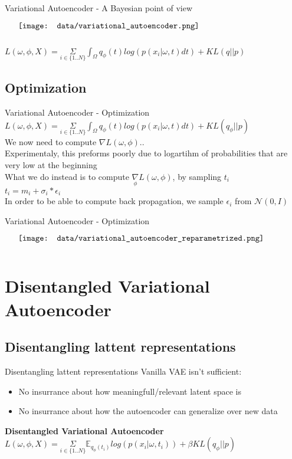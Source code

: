 \documentclass{beamer}
\begin{document}
\begin{frame}{Variational Autoencoder - A Bayesian point of view}
    \begin{minipage}{5in}
    \centering
    $\vcenter{
    \texttt{[image: data/variational\_autoencoder.png]} \\
    }$
    \end{minipage}
    $ L(\omega, \phi, X)= \underset{i \in \{1..N\}}{\Sigma} \int_\Omega q_\phi(t) log( p(x_i | \omega, t) dt) + KL( q || p ) $
\end{frame}


\subsection{Optimization}
\begin{frame}{Variational Autoencoder - Optimization}
        $ L(\omega, \phi, X)= \underset{i \in \{1..N\}}{\Sigma} \int_\Omega q_\phi(t) log( p(x_i | \omega, t) dt) + KL( q_\phi || p ) $\\
	We now need to compute $\nabla L(\omega, \phi).$.\\
	Experimentaly, this preforms poorly due to logartihm of probabilities that are very low at the beginning\\
	What we do instead is to compute $\underset{\phi}{\nabla} L(\omega,\phi)$, by sampling $t_i$ \\
	$t_i = m_i + \sigma_i * \epsilon_i$ \\
	In order to be able to compute back propagation, we sample $\epsilon_i$ from  $\mathcal{N}(0,I)$
\end{frame}

\begin{frame}{Variational Autoencoder - Optimization}
    \begin{minipage}{5in}
    \centering
    $\vcenter{
    \texttt{[image: data/variational\_autoencoder\_reparametrized.png]} \\
    }$
    \end{minipage}
\end{frame}

\section{Disentangled Variational Autoencoder}
\subsection{Disentangling lattent representations}
\begin{frame}{Disentangling lattent representations}
	Vanilla VAE isn't sufficient:
	\begin{itemize}
		\item No insurrance about how meaningfull/relevant latent space is 
		\item No insurrance about how the autoencoder can generalize over new data 
	\end{itemize}
    \bf{Disentangled Variational Autoencoder}
	$ L(\omega, \phi, X)= \underset{i \in \{1..N\}}{\Sigma} \mathbb{E}_{q_\phi(t_i)} log( p(x_i | \omega, t_i)) + \beta KL( q_\phi || p ) $
\end{frame}
\end{document}
